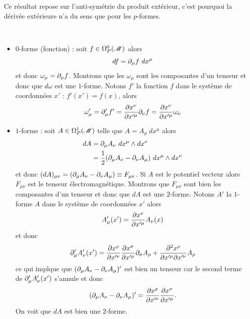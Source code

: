 \documentclass[a4paper,11pt]{report}
\begin{document}
            Ce résultat repose sur l'anti-symétrie du produit extérieur, c'est pourquoi la dérivée extérieure n'a du sens que pour les $p$-formes.
            
            \begin{exmp}${}$
                \begin{itemize}[label = \textbullet]
                    \item $0$-forme (fonction) : soit $f\in\Omega_P^0(\mathscr{M})$ alors 
                        \begin{equation}
                            df = \partial_\mu f ~dx^\mu
                        \end{equation}
                        et donc $\omega_\mu = \partial_\mu f$. Montrons que les $\omega_\mu$ sont les composantes d'un tenseur et donc que $d\omega$ est une $1$-forme. Notons $f'$ la fonction $f$ dans le système de coordonnées $x'$ : $f'(x') = f(x)$, alors
                        \begin{equation}
                            \omega'_\mu = \partial'_\mu f' = \pdv{x^\nu}{x'^\mu}\partial_{\nu}f = \pdv{x^\nu}{x'^\mu} \omega_\nu
                        \end{equation}
                    \item $1$-forme : soit $A\in\Omega_P^1(\mathscr{M})$ telle que $A=A_\mu~dx^\mu$ alors
                        \begin{align}
                            dA &= \partial_\mu A_\nu~dx^\mu\wedge dx^\nu\\
                            &= \frac{1}{2} (\partial_\mu A_\nu-\partial_\nu A_\mu)~dx^\mu\wedge dx^\nu
                        \end{align}
                        et donc $(dA)_{\mu\nu} = (\partial_\mu A_\nu-\partial_\nu A_\mu)\equiv F_{\mu\nu}$. Si $A$ est le potentiel vecteur alors $F_{\mu\nu}$ est le tenseur électromagnétique. Montrons que $F_{\mu\nu}$ sont bien les composantes d'un tenseur et donc que $dA$ est une $2$-forme. Notons $A'$ la $1$-forme $A$ dans le système de coordonnées $x'$ alors 
                        \begin{equation}
                            A'_\mu(x') = \pdv{x^\nu}{x'^\mu} A_\nu(x)
                        \end{equation}
                        et donc 
                        \begin{equation}
                            \partial'_\mu A'_\nu(x') = \pdv{x^\rho}{x'^\nu}\pdv{x^\sigma}{x'^\mu}\partial_\sigma A_\rho + \pdv{x^\rho}{x'^\mu}{x'^\nu} A_\rho
                        \end{equation}
                        ce qui implque que $(\partial_\mu A_\nu-\partial_\nu A_\mu)'$ est bien un tenseur car le second terme de $\partial'_\mu A'_\nu(x')$ s'annule et donc
                        \begin{equation}
                            (\partial_\mu A_\nu-\partial_\nu A_\mu)' = \pdv{x^\rho}{x'^\nu}\pdv{x^\sigma}{x'^\mu}(\partial_\sigma A_\rho-\partial_\rho A_\sigma).
                        \end{equation}
                        On voit que $dA$ est bien une $2$-forme.\\
                        

\end{itemize}
\end{exmp}
\end{document}
